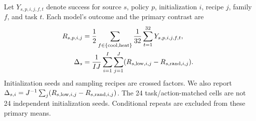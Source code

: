 Let $Y_{s,p,i,j,f,t}$ denote success for source $s$, policy $p$, initialization $i$, recipe $j$, family $f$, and task $t$. Each model's outcome and the primary contrast are
\begin{align}
 R_{s,p,i,j}&=\frac12\sum_{f\in\{\mathrm{cool},\mathrm{heat}\}}
                  \frac1{32}\sum_{t=1}^{32}Y_{s,p,i,j,f,t},\label{eq:success}\\
 \Delta_s&=\frac1{IJ}\sum_{i=1}^{I}\sum_{j=1}^{J}
                (R_{s,\mathrm{low},i,j}-R_{s,\mathrm{rand},i,j}).\label{eq:effect}
\end{align}
Initialization seeds and sampling recipes are crossed factors. We also report $\Delta_{s,i}=J^{-1}\sum_j(R_{s,\mathrm{low},i,j}-R_{s,\mathrm{rand},i,j})$. The 24 task/action-matched cells are not 24 independent initialization seeds. Conditional repeats are excluded from these primary means.
